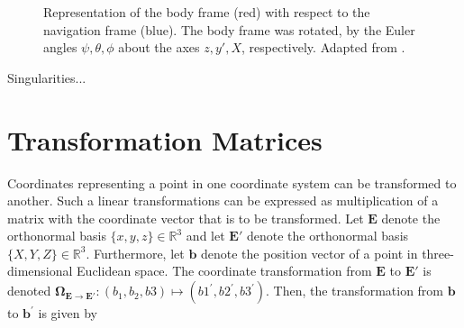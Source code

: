 \begin{figure}[ht]
\centering
{}
\caption{Representation of the body frame (red) with respect to the navigation frame (blue). The body frame was rotated, by the Euler angles $\psi, \theta, \phi$ about the axes $z, y', X$, respectively. Adapted from \cite{Wiki_taitbryan}.} \label{fig:Euler_angles}
\end{figure}

Singularities...

\section{Transformation Matrices}

Coordinates representing a point in one coordinate system can be transformed to another. Such a linear transformations can be expressed as multiplication of a matrix with the coordinate vector that is to be transformed. Let $\mathbf{E}$ denote the orthonormal basis $\{x, y, z\} \in \mathbb{R}^3$ and let $\mathbf{E}'$ denote the orthonormal basis $\{X, Y, Z\} \in \mathbb{R}^3$. Furthermore, let $\mathbf{b}$ denote the position vector of a point in three-dimensional Euclidean space. The coordinate transformation from $\mathbf{E}$ to $\mathbf{E}'$ is denoted $\bm{\Omega}_{\mathbf{E} \rightarrow \mathbf{E}'}: (b_1, b_2, b3) \mapsto (b1^{'}, b2^{'}, b3^{'})$. Then, the transformation from $\mathbf{b}$ to $\mathbf{b}^{'}$ is given by

